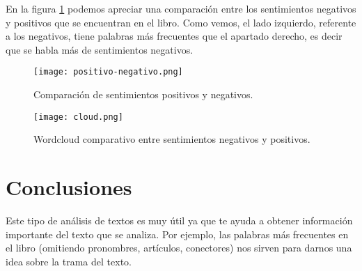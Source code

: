 \documentclass[12pt,letterpaper]{article}
\begin{document}
En la figura \ref{positivonegativo} podemos apreciar una comparación entre los sentimientos negativos y positivos que se encuentran en el libro. Como vemos, el lado izquierdo, referente a los negativos, tiene palabras más frecuentes que el apartado derecho, es decir que se habla más de sentimientos negativos.
\begin{figure}
\centering
\caption{Comparación de sentimientos positivos y negativos.}
\label{positivonegativo}
\texttt{[image: positivo-negativo.png]}
\end{figure}

\begin{figure}
\centering
\caption{Wordcloud comparativo entre sentimientos negativos y positivos.}
\label{negposit}
\texttt{[image: cloud.png]}
\end{figure}


\section{Conclusiones}
Este tipo de análisis de textos es muy útil ya que te ayuda a obtener información importante del texto que se analiza. Por ejemplo, las palabras más frecuentes en el libro (omitiendo pronombres, artículos, conectores) nos sirven para darnos una idea sobre la trama del texto.



 

\end{document}

